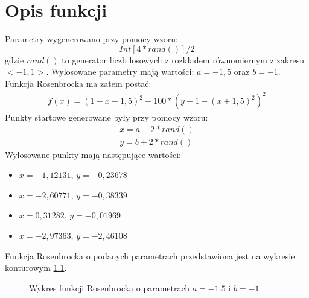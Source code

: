 \chapter{Opis funkcji}
Parametry wygenerowano przy pomocy wzoru:
\begin{equation}
Int[4*rand()]/2
\end{equation}
gdzie $rand()$ to generator liczb losowych z rozkładem równomiernym z zakresu $<-1,1>$.
Wylosowane parametry mają wartości: $a=-1,5$ oraz $b=-1$. Funkcja Rosenbrocka ma zatem postać:
\begin{equation}
\begin{split}
f(x)=(1-x-1,5)^2+100*(y+1-(x+1,5)^2)^2
\end{split}
\end{equation}
Punkty startowe generowane były przy pomocy wzoru:
\begin{equation}
\begin{split}
x=a+2*rand() \\
y=b+2*rand()
\end{split}
\end{equation}
Wylosowane punkty mają następujące wartości:
\begin{itemize}
  \item $x=-1,12131$, $y=-0,23678$
  \item $x=-2,60771$, $y=-0,38339$
  \item $x=0,31282$, $y=-0,01969$
  \item $x=-2,97363$, $y=-2,46108$
\end{itemize}
Funkcja Rosenbrocka o podanych parametrach przedstawiona jest na wykresie konturowym \ref{fig:rosenbrock}.
\begin{figure}
  \centering
  
  \caption{Wykres funkcji Rosenbrocka o parametrach $a=-1.5$ i $b=-1$}
  \label{fig:rosenbrock}
\end{figure}